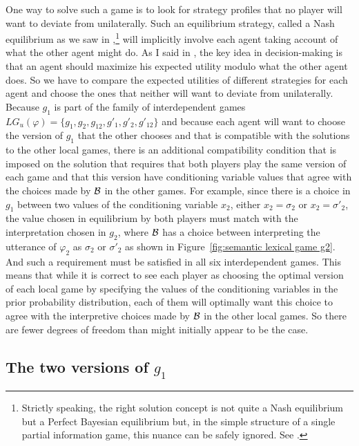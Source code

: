 One way to solve such a game is to look for strategy profiles that no player will want to deviate from unilaterally. Such an equilibrium strategy, called a Nash equilibrium as we saw in ,\footnote{Strictly speaking, the right solution concept is not quite a Nash equilibrium but a Perfect Bayesian equilibrium but, in the simple structure of a single partial information game, this nuance can be safely ignored. See \citet[Section~3.3.5]{parikh:le}.} will implicitly involve each agent taking account of what the other agent might do. As I said in , the key idea in decision-making is that an agent should maximize his expected utility modulo what the other agent does. So we have to compare the expected utilities of different strategies for each agent and choose the ones that neither will want to deviate from unilaterally. Because $g_1$ is part of the family of interdependent games $LG_u(\varphi) = \{g_1, g_2, g_{12}, g'_1, g'_2, g'_{12}\}$ and because each agent will want to choose the version of $g_1$ that the other chooses and that is compatible with the solutions to the other local games, there is an additional compatibility condition that is imposed on the solution that requires that both players play the same version of each game and that this version have conditioning variable values that agree with the choices made by $\cal B$ in the other games. For example, since there is a choice in $g_1$ between two values of the conditioning variable $x_2$, either $x_2 = \sigma_2$ or $x_2 = \sigma'_2$, the value chosen in equilibrium by both players must match with the interpretation chosen in $g_2$, where $\cal B$ has a choice between interpreting the utterance of $\varphi_2$ as $\sigma_2$ or $\sigma'_2$ as shown in Figure~\ref{fig:semantic lexical game g2}. And such a requirement must be satisfied in all six interdependent games. This means that while it is correct to see each player as choosing the optimal version of each local game by specifying the values of the conditioning variables in the prior probability distribution, each of them will optimally want this choice to agree with the interpretive choices made by $\cal B$ in the other local games. So there are fewer degrees of freedom than might initially appear to be the case.

\subsection{The two versions of $g_1$}

